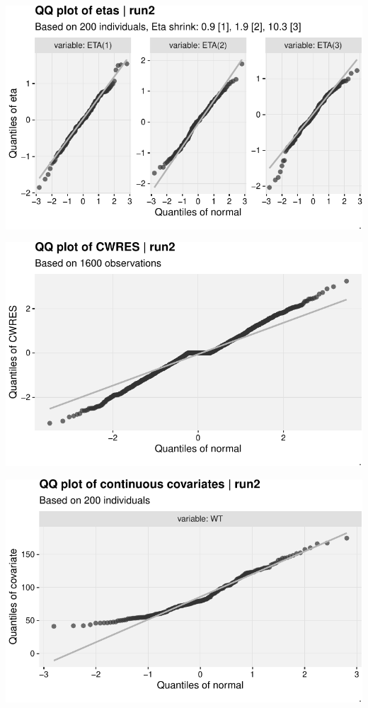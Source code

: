 \documentclass[
  letterpaper,
  toc=chapterentrywithdots,
  11pt,
  headings=small]{scrreprt}
\begin{document}
\includegraphics{sec/results_files/figure-pdf/unnamed-chunk-4-17.pdf}

\includegraphics{sec/results_files/figure-pdf/unnamed-chunk-4-18.pdf}

\includegraphics{sec/results_files/figure-pdf/unnamed-chunk-4-19.pdf}
\end{document}
